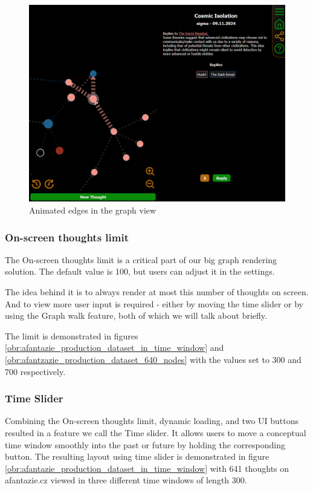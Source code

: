 \begin{figure}[p]
    \includegraphics[width=130mm, keepaspectratio]{img/afantazie_animated_edges.png}
    \caption{Animated edges in the graph view}
    \label{obr:afantazie_animated_edges}
\end{figure}

\subsubsection*{On-screen thoughts limit}
The On-screen thoughts limit is a critical part of our big graph rendering solution.
The default value is 100, but users can adjust it in the settings.

The idea behind it is to always render at most this number of thoughts on screen.
And to view more user input is required - either by moving the time slider or by using the Graph walk feature, both of which we will talk about briefly.

The limit is demonstrated in figures \ref{obr:afantazie_production_dataset_in_time_window} and \ref{obr:afantzazie_production_dataset_640_nodes} with the values set to 300 and 700 respectively.

\subsubsection*{Time Slider}
Combining the On-screen thoughts limit, dynamic loading, and two UI buttons resulted in a feature we call the Time slider.
It allows users to move a conceptual time window smoothly into the past or future by holding the corresponding button.
The resulting layout using time slider is demonstrated in figure \ref{obr:afantazie_production_dataset_in_time_window}
with 641 thoughts on afantazie.cz viewed in three different time windows of length 300.

